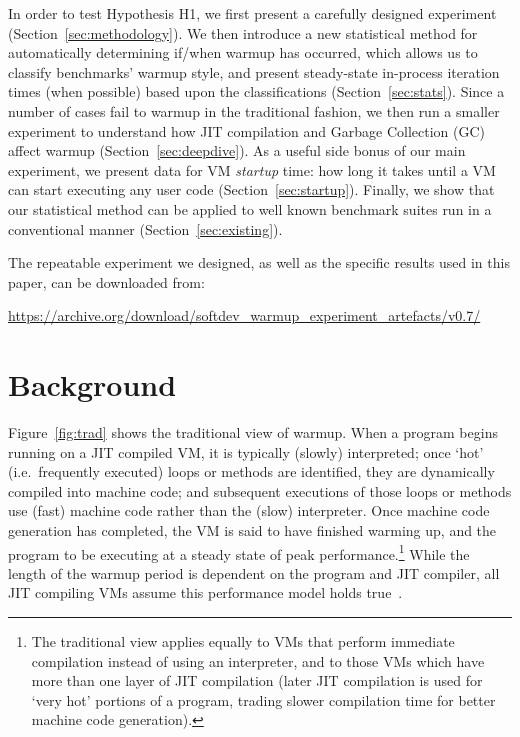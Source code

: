 \documentclass[preprint,numbers,10pt]{sigplanconf}
\begin{document}
\noindent In order to test Hypothesis H1, we first present a carefully designed
experiment (Section~\ref{sec:methodology}). We then introduce a new
statistical method for automatically determining if/when warmup has occurred,
which allows us to classify benchmarks' warmup style, and present steady-state
in-process iteration times (when possible) based upon the classifications
(Section~\ref{sec:stats}). Since a number of cases fail to warmup in the
traditional fashion, we then run a smaller experiment to understand how JIT
compilation and Garbage Collection (GC) affect warmup
(Section~\ref{sec:deepdive}). As a useful side bonus of our main experiment,
we present data for VM \emph{startup} time: how long it takes until a VM can
start executing any user code (Section~\ref{sec:startup}). Finally, we show that
our statistical method can be applied to well known benchmark suites run in a
conventional manner (Section~\ref{sec:existing}).

The repeatable experiment we designed, as well as the specific results used
in this paper, can be downloaded from:
\vspace{-.5em}
\begin{center}
\url{https://archive.org/download/softdev_warmup_experiment_artefacts/v0.7/}
\end{center}

\section{Background}
\label{sec:warmup}

Figure~\ref{fig:trad} shows the traditional view of warmup.
When a program begins running on a JIT compiled VM, it is typically (slowly)
interpreted; once `hot' (i.e.~frequently executed) loops or methods are
identified, they are dynamically compiled into machine code; and subsequent
executions of those loops or methods use (fast) machine code rather than the
(slow) interpreter. Once machine code generation has completed, the VM is
said to have finished warming up, and the program to be executing
at a steady state of peak performance.\footnote{The traditional view applies equally to VMs
that perform immediate compilation instead of using an interpreter, and to
those VMs which have more than one layer of JIT compilation (later JIT
compilation is used for `very hot' portions of a program, trading slower
compilation time for better machine code generation).}
While the length of the warmup period
is dependent on the program and JIT compiler, all JIT compiling
VMs assume this performance model holds true~\cite{kalibera13rigorous}.
\end{document}
